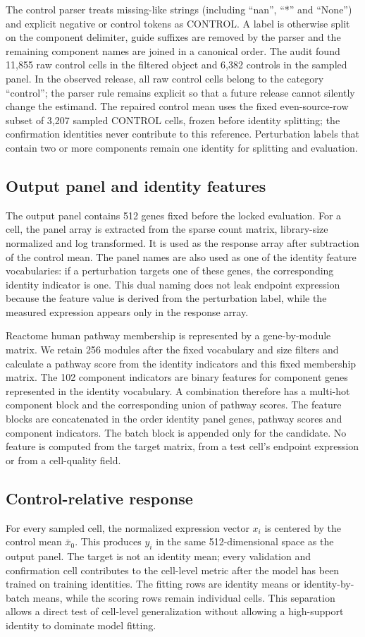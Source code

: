 \documentclass[10pt]{article}
\begin{document}
The control parser treats missing-like strings (including ``nan'', ``*'' and ``None'') and explicit negative or control tokens as CONTROL. A label is otherwise split on the component delimiter, guide suffixes are removed by the parser and the remaining component names are joined in a canonical order. The audit found 11,855 raw control cells in the filtered object and 6,382 controls in the sampled panel. In the observed release, all raw control cells belong to the category ``control''; the parser rule remains explicit so that a future release cannot silently change the estimand. The repaired control mean uses the fixed even-source-row subset of 3,207 sampled CONTROL cells, frozen before identity splitting; the confirmation identities never contribute to this reference. Perturbation labels that contain two or more components remain one identity for splitting and evaluation.

\subsection{Output panel and identity features}
The output panel contains 512 genes fixed before the locked evaluation. For a cell, the panel array is extracted from the sparse count matrix, library-size normalized and log transformed. It is used as the response array after subtraction of the control mean. The panel names are also used as one of the identity feature vocabularies: if a perturbation targets one of these genes, the corresponding identity indicator is one. This dual naming does not leak endpoint expression because the feature value is derived from the perturbation label, while the measured expression appears only in the response array.

Reactome human pathway membership is represented by a gene-by-module matrix. We retain 256 modules after the fixed vocabulary and size filters and calculate a pathway score from the identity indicators and this fixed membership matrix. The 102 component indicators are binary features for component genes represented in the identity vocabulary. A combination therefore has a multi-hot component block and the corresponding union of pathway scores. The feature blocks are concatenated in the order identity panel genes, pathway scores and component indicators. The batch block is appended only for the candidate. No feature is computed from the target matrix, from a test cell's endpoint expression or from a cell-quality field.

\subsection{Control-relative response}
For every sampled cell, the normalized expression vector $x_i$ is centered by the control mean $\bar{x}_0$. This produces $y_i$ in the same 512-dimensional space as the output panel. The target is not an identity mean; every validation and confirmation cell contributes to the cell-level metric after the model has been trained on training identities. The fitting rows are identity means or identity-by-batch means, while the scoring rows remain individual cells. This separation allows a direct test of cell-level generalization without allowing a high-support identity to dominate model fitting.
\end{document}
